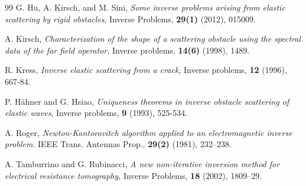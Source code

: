 \documentclass[11pt,reqno,twoside]{amsart}
\theoremstyle{definition}
\theoremstyle{remark}
\numberwithin{equation}{section}
\begin{document}
\begin{thebibliography}{99}
G. Hu, A. Kirsch, and M. Sini, {\it Some inverse problems arising from elastic scattering by rigid obstacles},  Inverse Problems, \textbf{29(1)} (2012), 015009.

A. Kirsch, {\it Characterization of the shape of a scattering obstacle using the spectral data of the far field operator}, Inverse problems, \textbf{14(6)} (1998), 1489.
 
R. Kress, {\it Inverse elastic scattering from a crack}, Inverse problems, \textbf{12} (1996), 667-84.
 
P. H\"ahner and G. Hsiao, {\it Uniqueness theorems in inverse obstacle scattering of elastic waves}, Inverse problems, \textbf{9} (1993), 525-534.
 
A. Roger, {\it Newton-Kantorovitch algorithm applied to an electromagnetic inverse problem}. IEEE Trans. Antennas Prop., \textbf{29(2)} (1981), 232–238.
 
A. Tamburrino and G. Rubinacci, {\it A new non-iterative inversion method for electrical resistance tomography}, Inverse Problems, \textbf{18} (2002), 1809–29.
 
 


\end{thebibliography}


%
%
\end{document}
